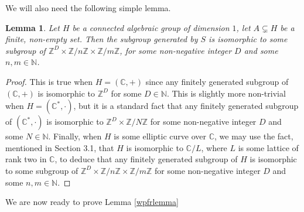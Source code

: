 \documentclass[12pt, reqno]{amsart}
\newtheorem{lem}[theorem]{Lemma}
\theoremstyle{remark}
\theoremstyle{definition}
\numberwithin{equation}{section}
\begin{document}
We will also need the following simple lemma. 

\begin{lem} \label{mst}
Let $H$ be a connected algebraic group of dimension $1$, let $A \subsetneq H$ be a finite, non-empty set. Then the subgroup generated by $S$ is isomorphic to some subgroup of $\mathbb{Z}^D \times \mathbb{Z}/n \mathbb{Z} \times \mathbb{Z}/m\mathbb{Z}$, for some non-negative integer $D$ and some $n,m\in \mathbb{N}$.
\end{lem}

\begin{proof}
    This is true when $H = (\mathbb{C}, +)$ since any finitely generated subgroup of $(\mathbb{C}, +)$ is isomorphic to $\mathbb{Z}^D$ for some $D \in \mathbb{N}$. This is slightly more non-trivial when $H = (\mathbb{C}^*, \cdot)$, but it is a standard fact that any finitely generated subgroup of $(\mathbb{C}^*, \cdot)$ is isomorphic to $\mathbb{Z}^D \times \mathbb{Z}/N \mathbb{Z}$ for some non-negative integer $D$ and some $N \in \mathbb{N}$. Finally, when $H$ is some elliptic curve over $\mathbb{C}$, we may use the fact, mentioned in Section 3.1, that $H$ is isomorphic to $\mathbb{C}/L$, where $L$ is some lattice of rank two in $\mathbb{C}$, to deduce that any finitely generated subgroup of $H$ is isomorphic to some subgroup of $\mathbb{Z}^D\times \mathbb{Z}/n\mathbb{Z} \times \mathbb{Z}/m\mathbb{Z}$ for some non-negative integer $D$ and some $n,m\in \mathbb{N}$.
\end{proof}


We are now ready to prove Lemma \ref{wpfrlemma}
\end{document}
